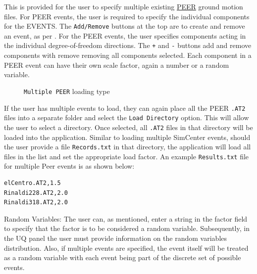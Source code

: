 This is provided for the user to specify multiple existing
\href{http://peer.berkeley.edu}{PEER} ground
motion files.  For PEER events, the user is required to specify the
individual components for the EVENTS.  The \texttt{Add/Remove} buttons
at the top are to create and remove an event, as
per . For the PEER events, the user
specifies components acting in the individual degree-of-freedom
directions.  The \texttt{+} and \texttt{-} buttons add and remove
components with remove removing all components selected. Each
component in a PEER event can have their own scale factor, again a
number or a random variable.

\begin{figure}[!htbp]
  \caption{\texttt{Multiple PEER} loading type}
  \label{fig:figure6}
\end{figure}

If the user has multiple events to load, they can again place all the
PEER \texttt{.AT2} files into a separate folder and select
the \texttt{Load Directory} option. This will allow the user to select
a directory. Once selected, all \texttt{.AT2} files in that directory will be
loaded into the application. Similar to loading multiple SimCenter
events, should the user provide a file \texttt{Records.txt} in that
directory, the application will load all files in the list and set the
appropriate load factor. An example \texttt{Results.txt} file for multiple Peer
events is as shown below:

\begin{verbatim}
elCentro.AT2,1.5
Rinaldi228.AT2,2.0
Rinaldi318.AT2,2.0
\end{verbatim}

Random Variables: The user can, as mentioned, enter a string in the
factor field to specify that the factor is to be considered a random
variable. Subsequently, in the UQ panel the user must provide
information on the random variables distribution. Also, if multiple
events are specified, the event itself will be treated as a random
variable with each event being part of the discrete set of possible
events.
